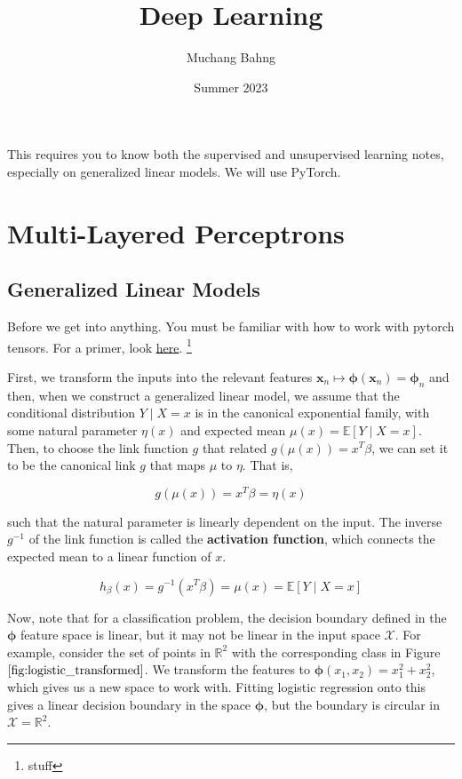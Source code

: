 \documentclass{article}
\begin{document}
\title{Deep Learning}
\author{Muchang Bahng}
\date{Summer 2023}

\maketitle

\tableofcontents

\pagebreak 

This requires you to know both the supervised and unsupervised learning notes, especially on generalized linear models. We will use PyTorch.

\section{Multi-Layered Perceptrons}

  \subsection{Generalized Linear Models}

    \begin{code}
      Before we get into anything. You must be familiar with how to work with pytorch tensors. For a primer, look \href{code/utilities.ipynb}{here}. \footnote{stuff}
    \end{code}

     First, we transform the inputs into the relevant features $\mathbf{x}_n \mapsto \boldsymbol{\phi} (\mathbf{x}_n) = \boldsymbol{\phi}_n$ and then, when we construct a generalized linear model, we assume that the conditional distribution $Y \mid X = x$ is in the canonical exponential family, with some natural parameter $\eta(x)$ and expected mean $\mu(x) = \mathbb{E}[Y \mid X = x]$. Then, to choose the link function $g$ that related $g(\mu(x)) = x^T \beta$, we can set it to be the canonical link $g$ that maps $\mu$ to $\eta$. That is, 
    
    \[g(\mu(x)) = x^T \beta = \eta (x)\]

    such that the natural parameter is linearly dependent on the input. The inverse $g^{-1}$ of the link function is called the \textbf{activation function}, which connects the expected mean to a linear function of $x$. 

      \[h_\beta (x) = g^{-1} (x^T \beta) = \mu(x) = \mathbb{E}[Y \mid X = x]\]

    Now, note that for a classification problem, the decision boundary defined in the $\boldsymbol{\phi}$ feature space is linear, but it may not be linear in the input space $\mathcal{X}$. For example, consider the set of points in $\mathbb{R}^2$ with the corresponding class in Figure $\ref{fig:logistic_transformed}$. We transform the features to $\boldsymbol{\phi}(x_1, x_2) = x_1^2 + x_2^2$, which gives us a new space to work with. Fitting logistic regression onto this gives a linear decision boundary in the space $\boldsymbol{\phi}$, but the boundary is circular in $\mathcal{X} = \mathbb{R}^2$. 
\end{document}
